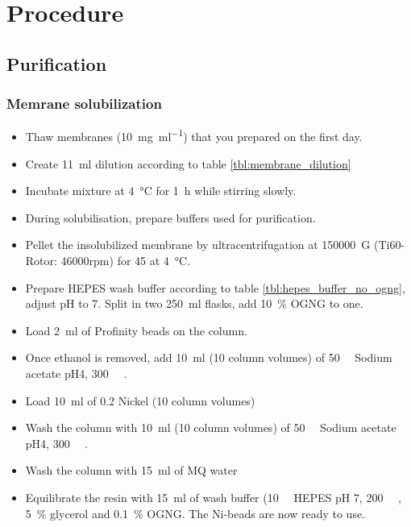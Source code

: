 \chapter{Procedure}

\section{Purification}

\subsection{Memrane solubilization}

\begin{itemize}
	\item Thaw membranes (\SI{10}{\mg\per\ml}) that you prepared on the
		first day.
	\item Create \SI{11}{\ml} dilution according to table
		\ref{tbl:membrane_dilution}
	\item Incubate mixture at \SI{4}{\celsius} for \SI{1}{\hour} while
		stirring slowly.
	\item During solubilisation, prepare buffers used for purification.
	\item Pellet the insolubilized membrane by ultracentrifugation at
		\SI{150000}{G} (Ti60-Rotor: 46000rpm) for \SI{45}{\min} at
		\SI{4}{\celsius}.
	\item Prepare HEPES wash buffer according to table
		\ref{tbl:hepes_buffer_no_ogng}, adjust pH to 7. Split in two
		\SI{250}{\ml} flasks, add \SI{10}{\percent} OGNG to one.
	\item Load \SI{2}{\ml} of Profinity beads on the column.
	\item Once ethanol is removed, add \SI{10}{\ml} (10 column volumes) of
		\SI{50}{\milli\Molar} Sodium acetate pH4,
		\SI{300}{\milli\Molar} .
	\item Load \SI{10}{\ml} of \SI{0.2}{\Molar} Nickel (10 column volumes) 
	\item Wash the column with \SI{10}{\ml} (10 column volumes) of
		\SI{50}{\milli\Molar} Sodium acetate pH4,
		\SI{300}{\milli\Molar} .
	\item Wash the column with \SI{15}{\ml} of MQ water
	\item Equilibrate the resin with \SI{15}{\ml} of wash buffer
		(\SI{10}{\milli\Molar} HEPES pH 7, \SI{200}{\milli\Molar}
		, \SI{5}{\percent} glycerol and \SI{0.1}{\percent}
		OGNG. The Ni-beads are now ready to use.
\end{itemize}

